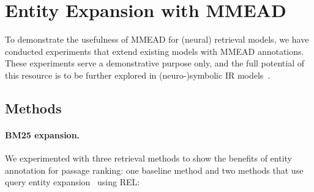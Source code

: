 \section{Entity Expansion with MMEAD}
To demonstrate the usefulness of MMEAD for (neural) retrieval models, we have conducted experiments that extend existing models with MMEAD annotations.
These experiments serve a demonstrative purpose only, and the full potential of this resource is to be further explored in (neuro-)symbolic IR models~\citep{Gerritse:2022:EMBERT,Tran:2022:DRE}.

\subsection{Methods}

\paragraph{BM25 expansion.} We experimented with three retrieval methods to show the benefits of entity annotation for passage ranking: one baseline method and two methods that use query entity expansion~\citep{Shehata} using REL:

